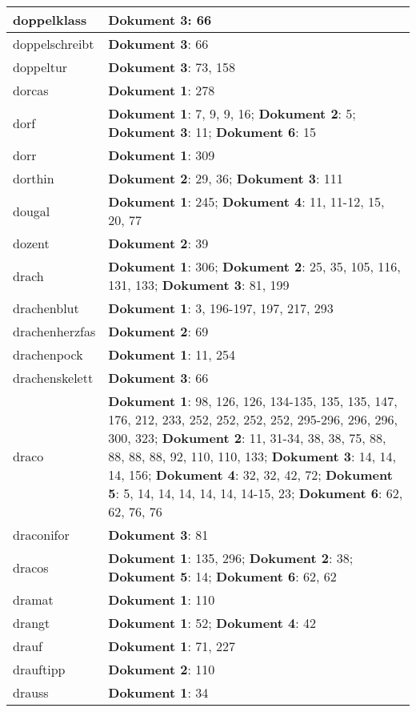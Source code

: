 \documentclass[a5paper]{article}
\begin{document}
\begin{longtable}[l]{|l|p{3in}|}
\hline
doppelklass & \textbf{Dokument 3}: 66 \\
\hline
doppelschreibt & \textbf{Dokument 3}: 66 \\
\hline
doppeltur & \textbf{Dokument 3}: 73, 158 \\
\hline
dorcas & \textbf{Dokument 1}: 278 \\
\hline
dorf & \textbf{Dokument 1}: 7, 9, 9, 16; \textbf{Dokument 2}: 5; \textbf{Dokument 3}: 11; \textbf{Dokument 6}: 15 \\
\hline
dorr & \textbf{Dokument 1}: 309 \\
\hline
dorthin & \textbf{Dokument 2}: 29, 36; \textbf{Dokument 3}: 111 \\
\hline
dougal & \textbf{Dokument 1}: 245; \textbf{Dokument 4}: 11, 11-12, 15, 20, 77 \\
\hline
dozent & \textbf{Dokument 2}: 39 \\
\hline
drach & \textbf{Dokument 1}: 306; \textbf{Dokument 2}: 25, 35, 105, 116, 131, 133; \textbf{Dokument 3}: 81, 199 \\
\hline
drachenblut & \textbf{Dokument 1}: 3, 196-197, 197, 217, 293 \\
\hline
drachenherzfas & \textbf{Dokument 2}: 69 \\
\hline
drachenpock & \textbf{Dokument 1}: 11, 254 \\
\hline
drachenskelett & \textbf{Dokument 3}: 66 \\
\hline
draco & \textbf{Dokument 1}: 98, 126, 126, 134-135, 135, 135, 147, 176, 212, 233, 252, 252, 252, 252, 295-296, 296, 296, 300, 323; \textbf{Dokument 2}: 11, 31-34, 38, 38, 75, 88, 88, 88, 88, 92, 110, 110, 133; \textbf{Dokument 3}: 14, 14, 14, 156; \textbf{Dokument 4}: 32, 32, 42, 72; \textbf{Dokument 5}: 5, 14, 14, 14, 14, 14, 14-15, 23; \textbf{Dokument 6}: 62, 62, 76, 76 \\
\hline
draconifor & \textbf{Dokument 3}: 81 \\
\hline
dracos & \textbf{Dokument 1}: 135, 296; \textbf{Dokument 2}: 38; \textbf{Dokument 5}: 14; \textbf{Dokument 6}: 62, 62 \\
\hline
dramat & \textbf{Dokument 1}: 110 \\
\hline
drangt & \textbf{Dokument 1}: 52; \textbf{Dokument 4}: 42 \\
\hline
drauf & \textbf{Dokument 1}: 71, 227 \\
\hline
drauftipp & \textbf{Dokument 2}: 110 \\
\hline
drauss & \textbf{Dokument 1}: 34 \\

\end{longtable}
\end{document}
